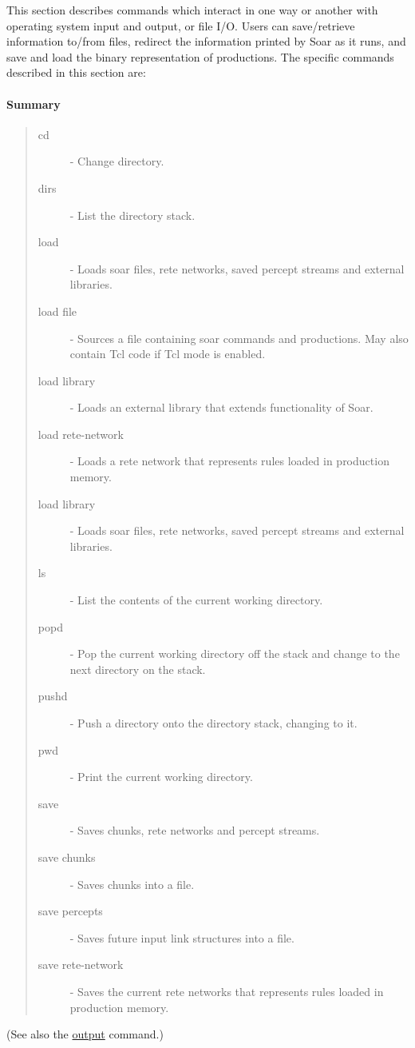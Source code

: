 This section describes commands which interact in one way or another
with operating system input and output, or file I/O.  Users can
save/retrieve information to/from files, redirect the information
printed by Soar as it runs, and save and load the binary representation
of productions.
The specific commands described in this section are:

\paragraph{Summary}
\begin{quote}
\begin{description}
\item[cd] - Change directory.
\item[dirs] - List the directory stack.
\item[load] - Loads soar files, rete networks, saved percept streams and external libraries.
\item[load file] - Sources a file containing soar commands and productions.  May also contain Tcl code if Tcl mode is enabled.
\item[load library] - Loads an external library that extends functionality of Soar.
\item[load rete-network] - Loads a rete network that represents rules loaded in production memory.
\item[load library] - Loads soar files, rete networks, saved percept streams and external libraries.
\item[ls] - List the contents of the current working directory.
\item[popd] - Pop the current working directory off the stack and change to the next directory on the stack.
\item[pushd] - Push a directory onto the directory stack, changing to it.
\item[pwd] - Print the current working directory.
\item[save] - Saves chunks, rete networks and percept streams.
\item[save chunks] - Saves chunks into a file.
\item[save percepts] - Saves future input link structures into a file.
\item[save rete-network] - Saves the current rete networks that represents rules loaded in production memory.
\end{description}
\end{quote}

(See also the \href{output}{output} command.)

